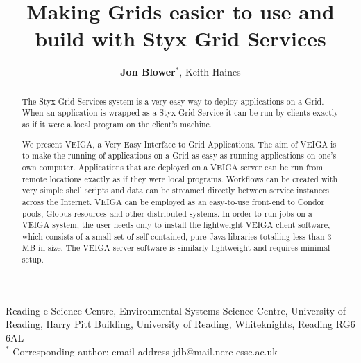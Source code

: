 \documentclass[a4paper]{article}
\begin{document}
\title{Making Grids easier to use and build with Styx Grid Services}

\author{\textbf{Jon Blower$^{*}$}, Keith Haines}
\date{}

\maketitle

\begin{center}
Reading e-Science Centre, Environmental Systems Science Centre, University of Reading, Harry Pitt Building, University of Reading, Whiteknights, Reading RG6 6AL \\
\medskip
$^{*}$ Corresponding author: email address jdb@mail.nerc-essc.ac.uk
\end{center}

\bigskip

\begin{abstract}
The Styx Grid Services system is a very easy way to deploy applications on a Grid.  When an application is wrapped as a Styx Grid Service it can be run by clients exactly as if it were a local program on the client's machine.  

We present VEIGA, a Very Easy Interface to Grid Applications.  The aim of VEIGA is to make the running of applications on a Grid as easy as running applications on one's own computer.  Applications that are deployed on a VEIGA server can be run from remote locations exactly as if they were local programs.  Workflows can be created with very simple shell scripts and data can be streamed directly between service instances across the Internet.  VEIGA can be employed as an easy-to-use front-end to Condor pools, Globus resources and other distributed systems.  In order to run jobs on a VEIGA system, the user needs only to install the lightweight VEIGA client software, which consists of a small set of self-contained, pure Java libraries totalling less than 3 MB in size.  The VEIGA server software is similarly lightweight and requires minimal setup.
\end{abstract}

\bigskip
\end{document}
